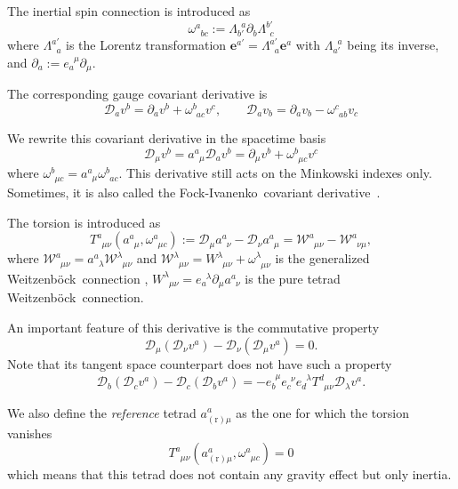 \documentclass[
10pt, %
a4paper, %
oneside, %
headinclude,footinclude, %
BCOR5mm, %
]{scrartcl}
\newcommand{\pd}{\partial}
\newcommand{\itetr}[2]{e^{\phantom{#2}#1}_{#2}}
\newcommand{\tetr}[2]{a^{#1}_{\phantom{#1}#2}}
\newcommand{\rtetr}[2]{a^{#1}_{(\text{r}) #2}}
\newcommand{\spin}[2]{\omega^{#1}_{\phantom{#1}#2}}
\newcommand{\Lor}[2]{\Lambda^{#1'}_{\phantom{#1}#2}}
\newcommand{\iLor}[2]{\Lambda^{\phantom{#2}#1}_{#2'}}
\newcommand{\D}[1]{\mathcal{D}_{#1}} %
\newcommand{\Tors}[2]{T^{#1}_{\phantom{a}#2}}
\newcommand{\W}[2]{\mathcal{W}^{#1}_{\phantom{#1}#2}}
\newcommand{\w}[2]{W^{#1}_{\phantom{#1}#2}}
\newcommand{\FI}{Fock-Ivanenko}
\newcommand{\We}{Weitzenb\"ock}
\begin{document}
The inertial spin connection is introduced as
\begin{equation}
\spin{a}{bc} := \iLor{a}{b}\pd_b\Lor{b}{c}
\end{equation}
where $ \Lor{a}{a} $ is the Lorentz transformation $ \bm{e}^{a'} = \Lor{a}{a} \bm{e}^a $ with $ 
\iLor{a}{a} $ being its inverse, and $ \pd_a := \itetr{\mu}{a} \pd_\mu $.

The corresponding gauge covariant derivative is 
\begin{equation}
\D{a} v^b = \pd_a v^b + \spin{b}{ac} v^c, \qquad \D{a} v_b = \pd_a v_b - \spin{c}{ab} v_c
\end{equation}

We rewrite this covariant derivative in the spacetime basis
\begin{equation}
\D{\mu} v^b = \tetr{a}{\mu} \D{a} v^b = \pd_\mu v^b + \spin{b}{\mu c} v^c
\end{equation}
where $ \spin{b}{\mu c} = \tetr{a}{\mu}\spin{b}{ac} $.
This derivative still acts on the Minkowski indexes only. Sometimes, it is also called the \FI\ 
covariant derivative~\cite{AldrovandiPereiraBook}.

The torsion is introduced as
\begin{equation}
\Tors{a}{\mu\nu}(\tetr{a}{\mu},\spin{a}{\mu c}):=\D{\mu}\tetr{a}{\nu} - \D{\nu}\tetr{a}{\mu} = 
\W{a}{\mu\nu} - \W{a}{\nu\mu},
\end{equation}
where $ \W{a}{\mu\nu} = \tetr{a}{\lambda}\W{\lambda}{\mu\nu}$ and $ \W{\lambda}{\mu\nu} = 
\w{\lambda}{\mu\nu} + \spin{\lambda}{\mu\nu}$ is the 
generalized \We\ connection \cite{AldrovandiPereiraBook}, $ \w{\lambda}{\mu\nu} = 
\itetr{\lambda}{a}\pd_\mu \tetr{a}{\nu}$ is 
the pure tetrad \We\ connection.


An important feature of this derivative is the commutative property
\begin{equation}\label{eqn.commut.D}
\D{\mu}(\D{\nu} v^a) - \D{\nu}(\D{\mu} v^a) = 0.
\end{equation}
Note that its tangent space counterpart does not have such a property
\begin{equation}
\D{b}(\D{c} v^a) - \D{c}(\D{b} v^a) = 
-\itetr{\mu}{b}\itetr{\nu}{c}\itetr{\lambda}{d}\Tors{d}{\mu\nu}\D{\lambda}v^a .
\end{equation}

We also define the \textit{reference} tetrad $ \rtetr{a}{\mu} $ as the one for which the torsion 
vanishes
\begin{equation}
\Tors{a}{\mu\nu}(\rtetr{a}{\mu},\spin{a}{\mu c}) = 0
\end{equation}
which means that this tetrad does not contain any gravity effect but only inertia.
\end{document}
